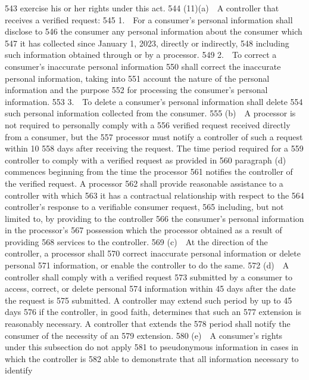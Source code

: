   543  exercise his or her rights under this act.
  544         (11)(a) A controller that receives a verified request:
  545         1. For a consumer’s personal information shall disclose to
  546  the consumer any personal information about the consumer which
  547  it has collected since January 1, 2023, directly or indirectly,
  548  including such information obtained through or by a processor.
  549         2. To correct a consumer’s inaccurate personal information
  550  shall correct the inaccurate personal information, taking into
  551  account the nature of the personal information and the purpose
  552  for processing the consumer’s personal information.
  553         3. To delete a consumer’s personal information shall delete
  554  such personal information collected from the consumer.
  555         (b) A processor is not required to personally comply with a
  556  verified request received directly from a consumer, but the
  557  processor must notify a controller of such a request within 10
  558  days after receiving the request. The time period required for a
  559  controller to comply with a verified request as provided in
  560  paragraph (d) commences beginning from the time the processor
  561  notifies the controller of the verified request. A processor
  562  shall provide reasonable assistance to a controller with which
  563  it has a contractual relationship with respect to the
  564  controller’s response to a verifiable consumer request,
  565  including, but not limited to, by providing to the controller
  566  the consumer’s personal information in the processor’s
  567  possession which the processor obtained as a result of providing
  568  services to the controller.
  569         (c) At the direction of the controller, a processor shall
  570  correct inaccurate personal information or delete personal
  571  information, or enable the controller to do the same.
  572         (d) A controller shall comply with a verified request
  573  submitted by a consumer to access, correct, or delete personal
  574  information within 45 days after the date the request is
  575  submitted. A controller may extend such period by up to 45 days
  576  if the controller, in good faith, determines that such an
  577  extension is reasonably necessary. A controller that extends the
  578  period shall notify the consumer of the necessity of an
  579  extension.
  580         (e) A consumer’s rights under this subsection do not apply
  581  to pseudonymous information in cases in which the controller is
  582  able to demonstrate that all information necessary to identify
